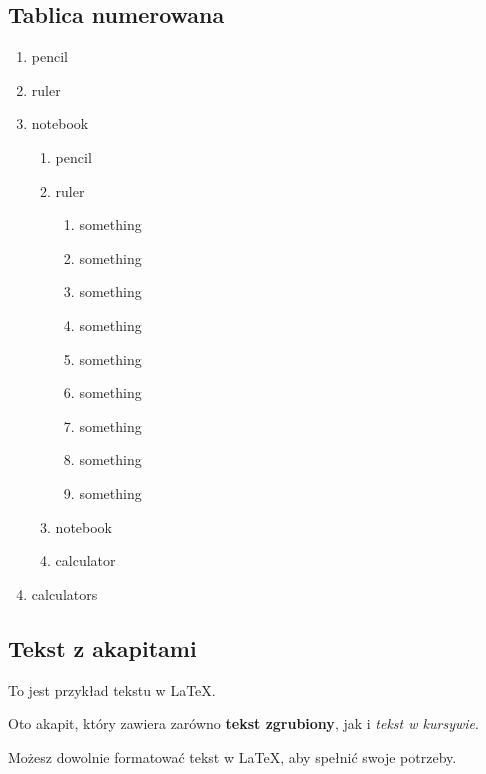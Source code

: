 \subsection{Tablica numerowana}

\begin{enumerate}
\item pencil 
\item ruler
\item notebook
    \begin{enumerate}
    \item pencil 
    \item ruler
    \begin{enumerate}
        \item something
        \item something
        \item something
        \item something
        \item something
        \item something
        \item something
        \item something
        \item something
    \end{enumerate}
    \item notebook
    \item calculator
    \end{enumerate}
\item calculators
\end{enumerate}

\subsection{Tekst z akapitami}
\begin{center}

To jest przykład tekstu w \LaTeX.
\begin{flushleft}
    Oto akapit, który zawiera zarówno
\textbf{tekst zgrubiony}, jak i \textit{tekst w kursywie}.\end{flushleft}
\par Możesz dowolnie formatować tekst w \LaTeX, aby spełnić swoje potrzeby.

\end{center}